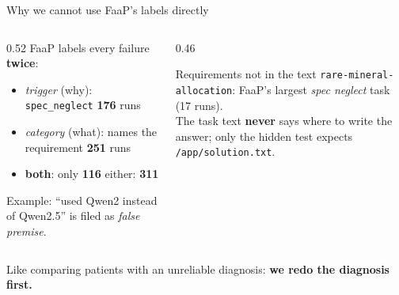 \documentclass[aspectratio=169,11pt]{beamer}
\begin{document}
\begin{frame}{Why we cannot use FaaP's labels directly}
  \begin{columns}[T]
    \begin{column}{0.52\textwidth}
      FaaP labels every failure \textbf{twice}:
      \begin{itemize}
        \item \emph{trigger} (why): \texttt{spec\_neglect} \textbf{176} runs
        \item \emph{category} (what): names the requirement \textbf{251} runs
        \item \textbf{both}: only \textbf{116} \quad either: \textbf{311}
      \end{itemize}
      \vspace{4pt}
      Example: ``used Qwen2 instead of Qwen2.5'' is filed as \emph{false premise}.
    \end{column}
    \begin{column}{0.46\textwidth}
      \begin{block}{Requirements not in the text}
        \texttt{rare-mineral-allocation}: FaaP's largest \emph{spec neglect} task (17 runs).\\
        The task text \textbf{never} says where to write the answer; only the hidden test expects
        \texttt{/app/solution.txt}.
      \end{block}
    \end{column}
  \end{columns}
  \vfill
  \centering Like comparing patients with an unreliable diagnosis: \textbf{we redo the diagnosis first.}
\end{frame}
\end{document}
